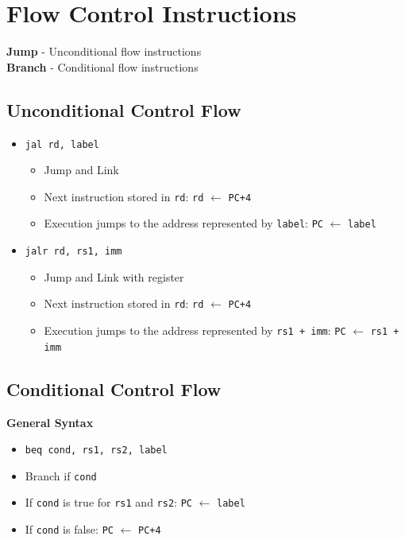 \documentclass{article}
\begin{document}
\section*{Flow Control Instructions}
\textbf{Jump} - Unconditional flow instructions \\
\textbf{Branch} - Conditional flow instructions

\subsection*{Unconditional Control Flow}
\begin{itemize}
    \item \texttt{jal rd, label}
    \begin{itemize}
        \item Jump and Link
        \item Next instruction stored in \texttt{rd}: \quad \texttt{rd} $\leftarrow$ \texttt{PC+4}
        \item Execution jumps to the address represented by \texttt{label}: \quad \texttt{PC} $\leftarrow$ \texttt{label}
    \end{itemize}
    \item \texttt{jalr rd, rs1, imm}
    \begin{itemize}
        \item Jump and Link with register
        \item Next instruction stored in \texttt{rd}: \quad \texttt{rd} $\leftarrow$ \texttt{PC+4}
        \item Execution jumps to the address represented by \texttt{rs1 + imm}: \quad \texttt{PC} $\leftarrow$ \texttt{rs1 + imm}
    \end{itemize}
\end{itemize}

\subsection*{Conditional Control Flow}
\textbf{General Syntax}
\begin{itemize}
    \item \texttt{beq cond, rs1, rs2, label}
    \item Branch if \texttt{cond}
    \item If \texttt{cond} is true for \texttt{rs1} and \texttt{rs2}: \quad \texttt{PC} $\leftarrow$ \texttt{label}
    \item If \texttt{cond} is false: \quad \texttt{PC} $\leftarrow$ \texttt{PC+4}
\end{itemize}
\end{document}
